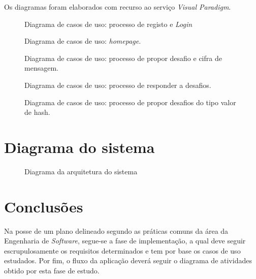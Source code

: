 Os diagramas foram elaborados com recurso ao serviço \textit{Visual Paradigm}.

\begin{figure}[!htbp]
    \centering
    \caption[Diagrama de casos de uso: processo de registo e \emph{Login}]{Diagrama de casos de uso: processo de registo e \emph{Login}}
    \label{fig::casos-uso-regis}
\end{figure}

\begin{figure}[!htbp]
    \centering
    \caption[Diagrama de casos de uso: \emph{homepage}]{Diagrama de casos de uso: \emph{homepage}.}
    \label{fig::casos-uso-homepage}
\end{figure}

\begin{figure}[!htbp]
    \centering
    \caption[Diagrama de casos de uso: processo de propor desafio e cifra de mensagem]{Diagrama de casos de uso: processo de propor desafio e cifra de mensagem.}
    \label{fig::casos-uso-propdesafio}
\end{figure}

\begin{figure}[!htbp]
    \centering
    \caption[Diagrama de casos de uso: processo de responder a desafios]{Diagrama de casos de uso: processo de responder a desafios.}
    \label{fig::casos-uso-repdesafio}
\end{figure}

\begin{figure}[!htbp]
    \centering
    \caption[Diagrama de casos de uso: processo de propor desafios do tipo valor de hash]{Diagrama de casos de uso: processo de propor desafios do tipo valor de hash.}
    \label{fig::casos-uso-hash}
\end{figure}

\section{Diagrama do sistema}
\label{sec::engsoft:diagrama-sistema}

\begin{figure}[!htbp]
    \centering
    \caption[Diagrama da arquitetura do sistema]{Diagrama da arquitetura do sistema}
    \label{fig::diagrama-sistema}
\end{figure}


\section{Conclusões}
\label{sec::engsoft:conclusao}

Na posse de um plano delineado segundo as práticas comuns da área da Engenharia de \textit{Software}, segue-se a fase de implementação, a qual deve seguir escrupulosamente os requisitos determinados e tem por base os casos de uso estudados. Por fim, o fluxo da aplicação deverá seguir o diagrama de atividades obtido por esta fase de estudo.


